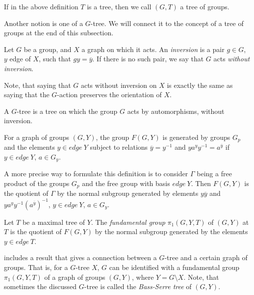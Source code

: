 If in the above definition $T$ is a tree, then we call $(G,T)$ a tree of groups.

Another notion is one of a $G$-tree. We will connect it to the concept of a tree of groups at the end of this subsection.

\begin{definition}
    Let $G$ be a group, and $X$ a graph on which it acts. An \emph{inversion} is a pair $g \in G$, $y$ edge of $X$, such that $gy = \overline{y}$. If there is no such pair, we say that $G$ acts \emph{without inversion}. 
\end{definition}

Note, that saying that $G$ acts without inversion on $X$ is exactly the same as saying that the $G$-action preserves the orientation of $X$.

\begin{definition}
    A $G$-tree is a tree on which the group $G$ acts by automorphisms, without inversion.
\end{definition}

\begin{definition}
    For a graph of groups $(G,Y)$, the group $F(G,Y)$ is generated by groups $G_p$ and the elements $y \in edge \: Y$ subject to relations $\overline{y} = y^{-1}$ and $ya^yy^{-1} = a^{\overline{y}}$ if $y \in edge \: Y$, $a \in G_y$.
\end{definition}

A more precise way to formulate this definition is to consider $\Gamma$ being a free product of the groups $G_p$ and the free group with basis $edge \: Y$. Then $F(G,Y)$ is the quotient of $\Gamma$ by the normal subgroup generated by elements $y\overline{y}$ and $ya^yy^{-1}(a^{\overline{y}})^{-1}$, $y \in edge\:Y$, $a \in G_y$.

\begin{definition}
    Let $T$ be a maximal tree of $Y$. The \emph{fundamental group} $\pi_1(G,Y,T)$ of $(G,Y)$ at $T$ is the quotient of $F(G,Y)$ by the normal subgroup generated by the elements $y \in edge\:T$.
\end{definition}

\cite[section I.5.4]{Ser80} includes a result that gives a connection between a $G$-tree and a certain graph of groups. That is, for a $G$-tree $X$, $G$ can be identified with a fundamental group $\pi_1(G,Y,T)$ of a graph of groups $(G,Y)$, where $Y = G\setminus X$.  Note, that sometimes the discussed $G$-tree is called the \emph{Bass-Serre tree} of $(G,Y)$.

